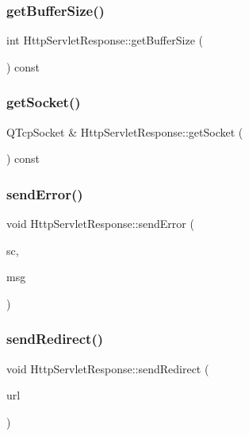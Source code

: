 \subsubsection{\texorpdfstring{get\+Buffer\+Size()}{getBufferSize()}}
{\footnotesize\ttfamily int Http\+Servlet\+Response\+::get\+Buffer\+Size (\begin{DoxyParamCaption}{ }\end{DoxyParamCaption}) const}

\mbox{\label{class_http_servlet_response_a723210f05b22fa9cfe84e3460c6b33ff}} 
\subsubsection{\texorpdfstring{get\+Socket()}{getSocket()}}
{\footnotesize\ttfamily Q\+Tcp\+Socket \& Http\+Servlet\+Response\+::get\+Socket (\begin{DoxyParamCaption}{ }\end{DoxyParamCaption}) const}

\mbox{\label{class_http_servlet_response_a7023895f3b4b730b7a97679bea88466b}} 
\subsubsection{\texorpdfstring{send\+Error()}{sendError()}}
{\footnotesize\ttfamily void Http\+Servlet\+Response\+::send\+Error (\begin{DoxyParamCaption}\item[{int}]{sc,  }\item[{const Q\+Byte\+Array \&}]{msg }\end{DoxyParamCaption})}

\mbox{\label{class_http_servlet_response_a3f4a749e518ad2b89aaf179c5e5fe034}} 
\subsubsection{\texorpdfstring{send\+Redirect()}{sendRedirect()}}
{\footnotesize\ttfamily void Http\+Servlet\+Response\+::send\+Redirect (\begin{DoxyParamCaption}\item[{const Q\+Byte\+Array \&}]{url }\end{DoxyParamCaption})}

